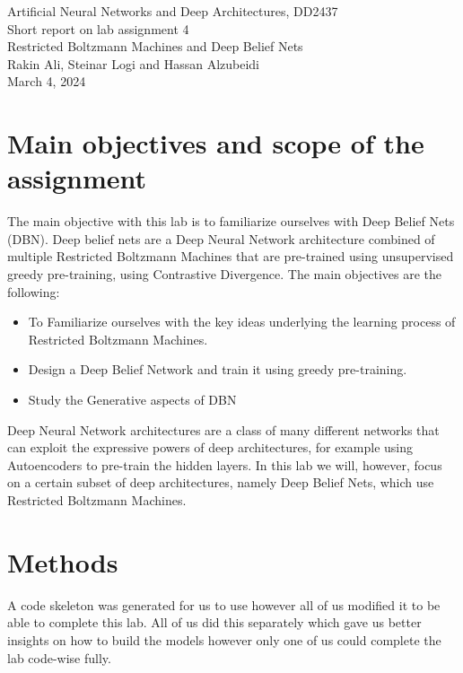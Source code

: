 \documentclass[a4paper]{article}
\begin{document}
\begin{center}
  {\large Artificial Neural Networks and Deep Architectures, DD2437}\\
  \vspace{7mm}
  {\huge Short report on lab assignment 4\\[1ex]}
  {\Large Restricted Boltzmann Machines and
Deep Belief Nets}\\
  \vspace{8mm}  
  {\Large Rakin Ali, Steinar Logi and Hassan Alzubeidi\\}
  \vspace{4mm}
  {\large March 4, 2024\\}
\end{center}



\section{Main objectives and scope of the assignment}

The main objective with this lab is to familiarize ourselves with Deep Belief Nets (DBN). Deep belief nets are a Deep Neural Network architecture combined of multiple Restricted Boltzmann Machines that are pre-trained using unsupervised greedy pre-training, using Contrastive Divergence. The main objectives are the following:  
\begin{itemize}
\item To Familiarize ourselves with the key ideas underlying the learning process of Restricted Boltzmann Machines.
\item Design a Deep Belief Network and train it using greedy pre-training.
\item Study the Generative aspects of DBN
\end{itemize}
Deep Neural Network architectures are a class of many different networks that can exploit the expressive powers of deep architectures, for example using Autoencoders to pre-train the hidden layers. In this lab we will, however, focus on a certain subset of deep architectures, namely Deep Belief Nets, which use Restricted Boltzmann Machines.

\section{Methods}
A code skeleton was generated for us to use however all of us modified it to be able to complete this lab. All of us did this separately which gave us better insights on how to build the models however only one of us could complete the lab code-wise fully. 
\end{document}
